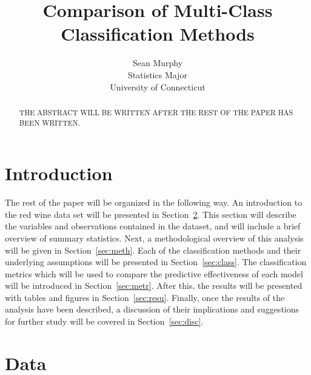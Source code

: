 \documentclass[12pt]{article}
\title{Comparison of Multi-Class Classification Methods}
\author{Sean Murphy\\
  Statistics Major\\
  University of Connecticut
}
\begin{document}
\maketitle

\begin{abstract}
THE ABSTRACT WILL BE WRITTEN AFTER THE REST OF THE PAPER HAS BEEN WRITTEN. 
\end{abstract}

\section{Introduction}
\label{sec:intro}




The rest of the paper will be organized in the following way.  
An introduction to the red wine data set will be presented in 
Section~\ref{sec:data}.  This section will describe the variables 
and observations contained in the dataset, and will include a brief 
overview of summary statistics.  Next, a methodological overview of 
this analysis will be given in Section~\ref{sec:meth}.  Each of the 
classification methods and their underlying assumptions will be 
presented in Section~\ref{sec:class}.  The classification metrics 
which will be used to compare the predictive effectiveness of each 
model will be introduced in Section~\ref{sec:metr}.  After this, 
the results will be presented with tables and figures in 
Section~\ref{sec:resu}.  Finally, once the results of the analysis 
have been described, a discussion of their implications and 
suggestions for further study will be covered in Section~\ref{sec:disc}.


\section{Data}
\label{sec:data}
\end{document}
